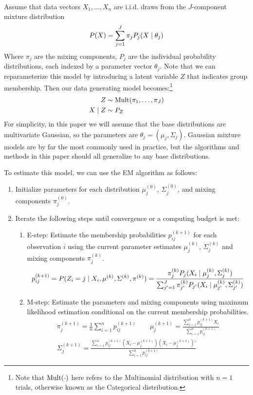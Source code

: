 \documentclass{article}
\newcommand*{\cond}{\;\ifnum\currentgrouptype=16 \middle\fi|\;}
\newcommand*{\mt}[1]{\text{\normalfont #1}}
\newcommand*{\dist}{\sim}
\theoremstyle{definition}
\theoremstyle{algodesc}
\begin{document}
Assume that data vectors $X_1, \dots, X_n$ are i.i.d. draws from the $J$-component mixture distribution
\begin{equation*}
P(X) = \sum_{j=1}^J \pi_j P_j(X \cond \theta_j)
\end{equation*}
Where $\pi_j$ are the mixing components, $P_j$ are the individual probability distributions, each indexed by a parameter vector $\theta_j$. Note that we can reparameterize this model by introducing a latent variable $Z$ that indicates group membership. Then our data generating model becomes:\footnote{Note that $\mt{Mult}(\cdot)$ here refers to the Multinomial distribution with $n=1$ trials, otherwise known as the Categorical distribution.}
\begin{align*}
Z &\dist \mt{Mult}(\pi_1, \dots, \pi_J) \\
X \cond Z &\dist P_Z
\end{align*}
For simplicity, in this paper we will assume that the base distributions are multivariate Gaussian, so the parameters are $\theta_j = (\mu_j, \Sigma_j)$. Gaussian mixture models are by far the most commonly used in practice, but the algorithms and methods in this paper should all generalize to any base distributions.

To estimate this model, we can use the EM algorithm as follows:
\begin{enumerate}
\item Initialize parameters for each distribution $\mu_j^{(0)}$, $\Sigma_j^{(0)}$, and mixing components $\pi_j^{(0)}$.
\item Iterate the following steps until convergence or a computing budget is met:
  \begin{enumerate}
  \item E-step: Estimate the membership probabilities $p_{ij}^{(k+1)}$ for each observation $i$ using the current parameter estimates $\mu_j^{(k)}$, $\Sigma_j^{(k)}$ and mixing components $\pi_j^{(k)}$.
    \begin{equation} \label{eq:em_estep}
    p_{ij}^{(k+1)} = P(Z_i = j \cond X_i, \mu^{(k)}, \Sigma^{(k)}, \pi^{(k)})
      = \frac{\pi_j^{(k)} P_j(X_i \cond \mu_j^{(k)}, \Sigma_j^{(k)})}{\sum_{j'=1}^J \pi_{j'}^{(k)} P_{j'}(X_i \cond \mu_{j'}^{(k)}, \Sigma_{j'}^{(k)})}
    \end{equation}
  \item M-step: Estimate the parameters and mixing components using maximum likelihood estimation conditional on the current membership probabilities.
    \begin{equation} \label{eq:em_mstep}
    \begin{gathered}
    \pi_j^{(k+1)} = \frac{1}{n} \sum_{i=1}^n p_{ij}^{(k+1)} \qquad
    \mu_j^{(k+1)} = \frac{\sum_{i=1}^n p_{ij}^{(k+1)} X_i}{\sum_{i=1}^n p_{ij}^{(k+1)}} \\
    \Sigma_j^{(k+1)} = \frac{\sum_{i=1}^n p_{ij}^{(k+1)} (X_i - \mu_j^{(k+1)}) (X_i - \mu_j^{(k+1)})'}{\sum_{i=1}^n p_{ij}^{(k+1)}}
    \end{gathered}
    \end{equation}
  \end{enumerate}
\end{enumerate}
\end{document}

